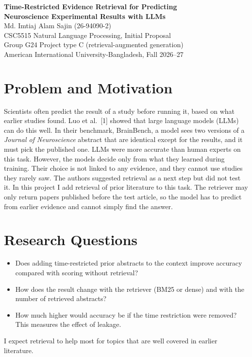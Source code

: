 \documentclass[10pt,a4paper]{article}
\begin{document}
\begin{center}
{\large\bfseries Time-Restricted Evidence Retrieval for Predicting\\ Neuroscience Experimental Results with LLMs}\\[5pt]
Md. Imtiaj Alam Sajin (26-94090-2)\\[1pt]
CSC5515 Natural Language Processing, Initial Proposal\\[1pt]
Group G24 \quad Project type C (retrieval-augmented generation)\\[1pt]
American International University-Bangladesh, Fall 2026--27
\end{center}

\section{Problem and Motivation}
Scientists often predict the result of a study before running it, based on what earlier studies found. Luo et al.~[1] showed that large language models (LLMs) can do this well. In their benchmark, BrainBench, a model sees two versions of a \emph{Journal of Neuroscience} abstract that are identical except for the results, and it must pick the published one. LLMs were more accurate than human experts on this task. However, the models decide only from what they learned during training. Their choice is not linked to any evidence, and they cannot use studies they rarely saw. The authors suggested retrieval as a next step but did not test it. In this project I add retrieval of prior literature to this task. The retriever may only return papers published before the test article, so the model has to predict from earlier evidence and cannot simply find the answer.

\section{Research Questions}
\begin{itemize}
\item[RQ1.] Does adding time-restricted prior abstracts to the context improve accuracy compared with scoring without retrieval?
\item[RQ2.] How does the result change with the retriever (BM25 or dense) and with the number of retrieved abstracts?
\item[RQ3.] How much higher would accuracy be if the time restriction were removed? This measures the effect of leakage.
\end{itemize}
I expect retrieval to help most for topics that are well covered in earlier literature.
\end{document}
